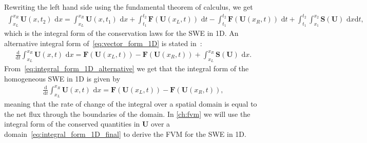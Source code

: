 Rewriting the left hand side using the fundamental theorem of calculus, we get
\begin{align}\label{eq:integral_form_1D_final}
    \int_{x_L}^{x_R} \mathbf{U}(x, t_2) \text{ d}x =
    \int_{x_L}^{x_R}  \mathbf{U}(x, t_1) \text{ d}x + \int_{t_1}^{t_2} \mathbf{F}(\mathbf{U}(x_L, t)) \text{ d}t - \int_{t_1}^{t_2} \mathbf{F}(\mathbf{U}(x_R, t)) \text{ d}t + \int_{t_1}^{t_2} \int_{x_1}^{x_2} \mathbf{S(U)} \text{ d}x \text{d}t,
\end{align}
which is the integral form of the conservation laws for the SWE in 1D.
An alternative integral form of~\eqref{eq:vector_form_1D} is stated in~\cite{Toro2024}:
\begin{align}\label{eq:integral_form_1D_alternative}
    \frac{\text{d}}{\text{d}t} \int_{x_L}^{x_R} \mathbf{U}(x,t) \text{ d}x = \mathbf{F}(\mathbf{U}(x_L, t)) - \mathbf{F}(\mathbf{U}(x_R, t)) + \int_{x_L}^{x_R} \mathbf{S}(\mathbf{U}) \text{ d}x.
\end{align}
From~\eqref{eq:integral_form_1D_alternative} we get that the integral form of the homogeneous SWE in 1D is given by
\begin{align}\label{eq:integral_form_1D_homogeneous}
    \frac{\text{d}}{\text{d}t} \int_{x_L}^{x_R} \mathbf{U}(x,t) \text{ d}x = \mathbf{F}(\mathbf{U}(x_L, t)) - \mathbf{F}(\mathbf{U}(x_R, t)),
\end{align}
meaning that the rate of change of the integral over a spatial domain is equal to the net flux through the boundaries of the domain.
In \autoref{ch:fvm} we will use the integral form of the conserved quantities in $\mathbf{U}$ over a domain~\eqref{eq:integral_form_1D_final} to derive the FVM for the SWE in 1D.


